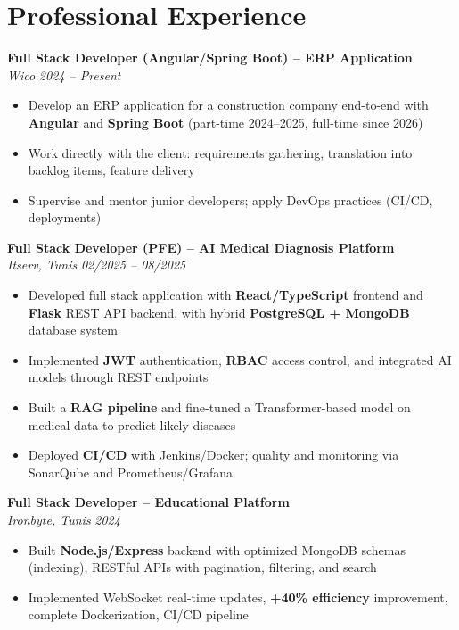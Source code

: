 \documentclass[10pt,a4paper]{article}
\begin{document}
\vspace{6pt}

\section*{Professional Experience}
{\small

\textbf{Full Stack Developer (Angular/Spring Boot) -- ERP Application}\\[1pt]
\textit{Wico} \hfill \textit{2024 -- Present}
\begin{itemize}
  \item Develop an ERP application for a construction company end-to-end with \textbf{Angular} and \textbf{Spring Boot} (part-time 2024--2025, full-time since 2026)
  \item Work directly with the client: requirements gathering, translation into backlog items, feature delivery
  \item Supervise and mentor junior developers; apply DevOps practices (CI/CD, deployments)
\end{itemize}

\vspace{3pt}
\textbf{Full Stack Developer (PFE) -- AI Medical Diagnosis Platform}\\[1pt]
\textit{Itserv, Tunis} \hfill \textit{02/2025 -- 08/2025}
\begin{itemize}
  \item Developed full stack application with \textbf{React/TypeScript} frontend and \textbf{Flask} REST API backend, with hybrid \textbf{PostgreSQL + MongoDB} database system
  \item Implemented \textbf{JWT} authentication, \textbf{RBAC} access control, and integrated AI models through REST endpoints
  \item Built a \textbf{RAG pipeline} and fine-tuned a Transformer-based model on medical data to predict likely diseases
  \item Deployed \textbf{CI/CD} with Jenkins/Docker; quality and monitoring via SonarQube and Prometheus/Grafana
\end{itemize}

\vspace{3pt}
\textbf{Full Stack Developer -- Educational Platform}\\[1pt]
\textit{Ironbyte, Tunis} \hfill \textit{2024}
\begin{itemize}
  \item Built \textbf{Node.js/Express} backend with optimized MongoDB schemas (indexing), RESTful APIs with pagination, filtering, and search
  \item Implemented WebSocket real-time updates, \textbf{+40\% efficiency} improvement, complete Dockerization, CI/CD pipeline
\end{itemize}

}
\end{document}
